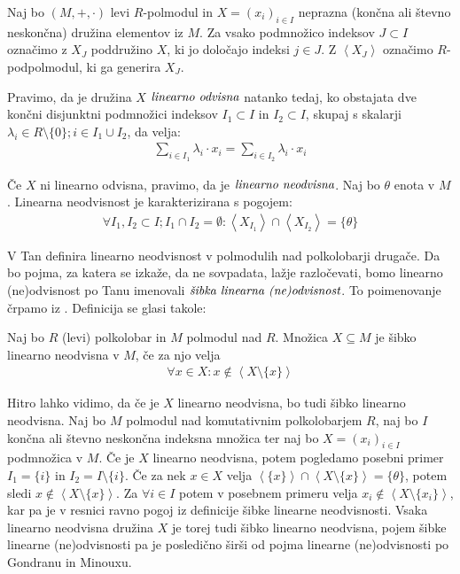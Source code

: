 \documentclass[mat1]{fmfdelo}
\newcommand{\pojem}[1]{\ensuremath{\emph{#1}}}
\newcommand{\Gen}[1]{\ensuremath{\left<{#1}\right>}}
\begin{document}
\begin{definicija}
	\label{def:linneodv1}
	Naj bo $(M, +, \cdot)$ levi $R$-polmodul in $X = (x_i)_{i \in I}$ neprazna (končna ali števno neskončna) družina elementov iz $M$. Za vsako podmnožico indeksov $J \subset I$ označimo z $X_J$ poddružino $X$, ki jo določajo indeksi $j\in J$. Z $\Gen{X_J}$ označimo $R$-podpolmodul, ki ga generira $X_J$.
	
	Pravimo, da je družina $X$ \pojem{linearno odvisna} natanko tedaj, ko obstajata dve končni disjunktni podmnožici indeksov $I_1\subset I$ in $I_2\subset I$, skupaj s skalarji $\lambda_i \in R\setminus\{0\}; i\in I_1\cup I_2$, da velja: \begin{align*}
		\sum_{i \in I_1}\lambda_i\cdot x_i = \sum_{i \in I_2}\lambda_i\cdot x_i 
	\end{align*}

	Če $X$ ni linearno odvisna, pravimo, da je \pojem{linearno neodvisna}. Naj bo $\theta$ enota v $M$. Linearna neodvisnost je karakterizirana s pogojem: \begin{align}
		\forall I_1, I_2 \subset I; I_1\cap I_2 =\emptyset: \Gen{X_{I_1}}\cap\Gen{X_{I_2}} = \{\theta\}
	\end{align}
\end{definicija}

V \cite[definicija 2.\,3.\,]{bib:Tanbase} Tan definira linearno neodvisnost v polmodulih nad polkolobarji drugače. Da bo pojma, za katera se izkaže, da ne sovpadata, lažje razločevati, bomo linearno (ne)odvisnost po Tanu imenovali \pojem{šibka linearna (ne)odvisnost}. To poimenovanje črpamo iz \cite[definicija 2. 12.]{bib:AkianTropSemi}. Definicija se glasi takole:
\begin{definicija}\label{def:linneodv2}
	Naj bo $R$ (levi) polkolobar in $M$ polmodul nad $R$. Množica $X\subseteq M$ je šibko linearno neodvisna v $M$, če za njo velja
\begin{align}
	\forall x\in X: x \notin \Gen{X\setminus\{x\}}
\end{align}
\end{definicija}

Hitro lahko vidimo, da če je $X$ linearno neodvisna, bo tudi šibko linearno neodvisna. Naj bo $M$ polmodul nad komutativnim polkolobarjem $R$, naj bo $I$ končna ali števno neskončna indeksna množica ter naj bo $X = (x_i)_{i\in I}$ podmnožica v $M$. 
Če je $X$ linearno neodvisna, potem pogledamo posebni primer $I_1 = \{i\}$ in $I_2 = I\setminus\{i\}$. Če za nek $x\in X$ velja $\Gen{\{x\}}\cap \Gen{X\setminus\{x\}} = \{\theta\}$, potem sledi $x\notin \Gen{X\setminus\{x\}}$. Za $\forall i \in I$ potem v posebnem primeru velja $x_i \notin \Gen{X\setminus\{x_i\}}$, kar pa je v resnici ravno pogoj iz definicije šibke linearne neodvisnosti. Vsaka linearno neodvisna družina $X$ je torej tudi šibko linearno neodvisna, pojem šibke linearne (ne)odvisnosti pa je posledično širši od pojma linearne (ne)odvisnosti po Gondranu in Minouxu.
\end{document}
